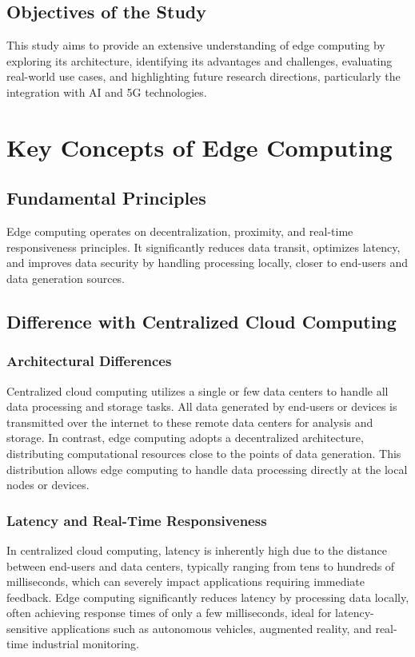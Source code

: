 \documentclass[runningheads]{llncs}
\begin{document}
\subsection{Objectives of the Study}
This study aims to provide an extensive understanding of edge computing by exploring its architecture, identifying its advantages and challenges, evaluating real-world use cases, and highlighting future research directions, particularly the integration with AI and 5G technologies.

\section{Key Concepts of Edge Computing}
\subsection{Fundamental Principles}
Edge computing operates on decentralization, proximity, and real-time responsiveness principles. It significantly reduces data transit, optimizes latency, and improves data security by handling processing locally, closer to end-users and data generation sources.

\subsection{Difference with Centralized Cloud Computing}

\subsubsection{Architectural Differences}
Centralized cloud computing utilizes a single or few data centers to handle all data processing and storage tasks. All data generated by end-users or devices is transmitted over the internet to these remote data centers for analysis and storage. In contrast, edge computing adopts a decentralized architecture, distributing computational resources close to the points of data generation. This distribution allows edge computing to handle data processing directly at the local nodes or devices.

\subsubsection{Latency and Real-Time Responsiveness}
In centralized cloud computing, latency is inherently high due to the distance between end-users and data centers, typically ranging from tens to hundreds of milliseconds, which can severely impact applications requiring immediate feedback. Edge computing significantly reduces latency by processing data locally, often achieving response times of only a few milliseconds, ideal for latency-sensitive applications such as autonomous vehicles, augmented reality, and real-time industrial monitoring.
\end{document}
